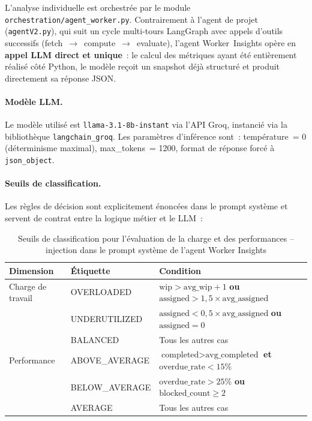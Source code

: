 L'analyse individuelle est orchestrée par le module \texttt{orchestration/agent\_worker.py}. Contrairement à l'agent de projet (\texttt{agentV2.py}), qui suit un cycle multi-tours LangGraph avec appels d'outils successifs (fetch~$\to$~compute~$\to$~evaluate), l'agent Worker~Insights opère en \textbf{appel LLM direct et unique}~: le calcul des métriques ayant été entièrement réalisé côté Python, le modèle reçoit un snapshot déjà structuré et produit directement sa réponse JSON.

\paragraph{Modèle LLM.} Le modèle utilisé est \texttt{llama-3.1-8b-instant} via l'API Groq, instancié via la bibliothèque \texttt{langchain\_groq}. Les paramètres d'inférence sont~: température~= 0 (déterminisme maximal), max\_tokens~= 1200, format de réponse forcé à \texttt{json\_object}.

\paragraph{Seuils de classification.} Les règles de décision sont explicitement énoncées dans le prompt système et servent de contrat entre la logique métier et le LLM~:

\begin{table}[H]
\centering
\begin{tabular}{lll}
\hline
\textbf{Dimension} & \textbf{Étiquette} & \textbf{Condition} \\
\hline
Charge de travail & OVERLOADED     & $\text{wip} > \text{avg\_wip} + 1$ \textbf{ou} $\text{assigned} > 1{,}5 \times \text{avg\_assigned}$ \\
                  & UNDERUTILIZED  & $\text{assigned} < 0{,}5 \times \text{avg\_assigned}$ \textbf{ou} $\text{assigned} = 0$ \\
                  & BALANCED       & Tous les autres cas \\
\hline
Performance       & ABOVE\_AVERAGE & $\text{completed} > \text{avg\_completed}$ \textbf{et} $\text{overdue\_rate} < 15\%$ \\
                  & BELOW\_AVERAGE & $\text{overdue\_rate} > 25\%$ \textbf{ou} $\text{blocked\_count} \geq 2$ \\
                  & AVERAGE        & Tous les autres cas \\
\hline
\end{tabular}
\caption{Seuils de classification pour l’évaluation de la charge et des performances – injection dans le prompt système de l’agent Worker Insights}
\label{tab:worker-thresholds}
\end{table}

